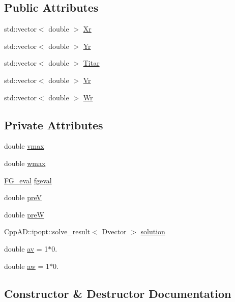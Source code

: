 \subsection*{Public Attributes}
\begin{DoxyCompactItemize}
\item 
std\+::vector$<$ double $>$ \hyperlink{classmyNLP_a723f46ade7987968c50f5b1dc4044bc8}{Xr}
\item 
std\+::vector$<$ double $>$ \hyperlink{classmyNLP_af981a9af6b17e3b406faf365898cfd10}{Yr}
\item 
std\+::vector$<$ double $>$ \hyperlink{classmyNLP_aefab14beb6186061e423865d05645c78}{Titar}
\item 
std\+::vector$<$ double $>$ \hyperlink{classmyNLP_aeea9f95bdd67cf56e2ec2a79944a3cb9}{Vr}
\item 
std\+::vector$<$ double $>$ \hyperlink{classmyNLP_aa3176f5469491b6432f6da85a426957e}{Wr}
\end{DoxyCompactItemize}
\subsection*{Private Attributes}
\begin{DoxyCompactItemize}
\item 
double \hyperlink{classmyNLP_a1ae02d6ab35595595e960b8571558425}{vmax}
\item 
double \hyperlink{classmyNLP_afc3c8ef8ab19ef14565825f779ae104c}{wmax}
\item 
\hyperlink{classFG__eval}{F\+G\+\_\+eval} \hyperlink{classmyNLP_ab8a19e8b3a951c8c7dbe8aad6e3ef270}{fgeval}
\item 
double \hyperlink{classmyNLP_ad357ad6cc7784e3285cfa90b6dc2cc2e}{preV}
\item 
double \hyperlink{classmyNLP_a79269c0f690c30c3127f1453838b72ba}{preW}
\item 
Cpp\+A\+D\+::ipopt\+::solve\+\_\+result$<$ Dvector $>$ \hyperlink{classmyNLP_ab56c3a82e2b58faa2278143b0d014ff2}{solution}
\item 
double \hyperlink{classmyNLP_a99c70b6afb9e1147bbff6da0d58067ec}{av} = 1$\ast$0.
\item 
double \hyperlink{classmyNLP_ae6e75bd5ed3daab0b9d329aed9908095}{aw} = 1$\ast$0.
\end{DoxyCompactItemize}


\subsection{Constructor \& Destructor Documentation}
\mbox{\label{classmyNLP_afc4d8a138c3bfbae32449c4360ef4b16}} 
